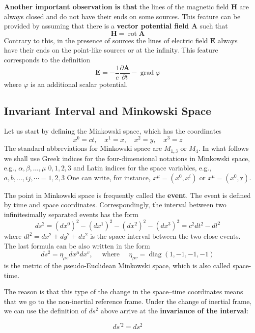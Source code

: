 \textbf{Another important observation is that} the lines of the magnetic field $\mathbf{H}$ are always closed and do not have their ends on some sources. This feature can be provided by assuming that there is a \textbf{vector potential field $\mathbf{A}$} such that
\begin{equation}
\mathbf{H}=\operatorname{rot} \mathbf{A}
\end{equation}
Contrary to this, in the presence of sources the lines of electric field $\mathbf{E}$ always have their ends on the point-like sources or at the infinity. This feature corresponds to the definition
\begin{equation}
\mathbf{E}=-\frac{1}{c} \frac{\partial \mathbf{A}}{\partial t}-\operatorname{grad} \varphi
\end{equation}
where $\varphi$ is an additional scalar potential.
\subsection{Invariant Interval and Minkowski Space}
Let us start by defining the Minkowski space, which has the coordinates
\begin{equation}
x^{0}=c t, \quad x^{1}=x, \quad x^{2}=y, \quad x^{3}=z
\end{equation}
The standard abbreviations for Minkowski space are $M_{1,3}$ or $M_4$. In what follows we shall use Greek indices for the four-dimensional notations in Minkowski space, e.g., $\alpha, \beta, \ldots, \mu$
$0,1,2,3$ and Latin indices for the space variables, e.g., $a, b, \ldots, i j, \cdots=1,2,3$ One can write, for instance, $x^{\mu}=\left(x^{0}, x^{i}\right)$ or $x^{\mu}=\left(x^{0}, \mathbf{r}\right)$.

The point in Minkowski space is frequently called the \textbf{event}. The event is defined by time and space coordinates. Correspondingly, the interval between two infinitesimally separated events has the form
\begin{equation}
d s^{2}=\left(d x^{0}\right)^{2}-\left(d x^{1}\right)^{2}-\left(d x^{2}\right)^{2}-\left(d x^{3}\right)^{2}=c^{2} d t^{2}-d l^{2}
\end{equation}
where $d l^{2}=d x^{2}+d y^{2}+d z^{2}$ is the space interval between the two close events. The last formula can be also written in the form
\begin{equation}
d s^{2}=\eta_{\mu v} d x^{\mu} d x^{v}, \quad \text { where } \quad \eta_{\mu v}=\operatorname{diag}(1,-1,-1,-1)
\end{equation}
is the metric of the $p$seudo-Euclidean Minkowski space, which is also called space-
time. 

 The reason is that this type of the change in the space–time coordinates means that we go to the non-inertial reference frame. Under the change of inertial frame, we can use the definition of $ds^2$ above arrive at the \textbf{invariance of the interval}:
\begin{qt}
    \begin{equation}
d s^{\prime 2}=d s^{2}
\end{equation}
\end{qt}
